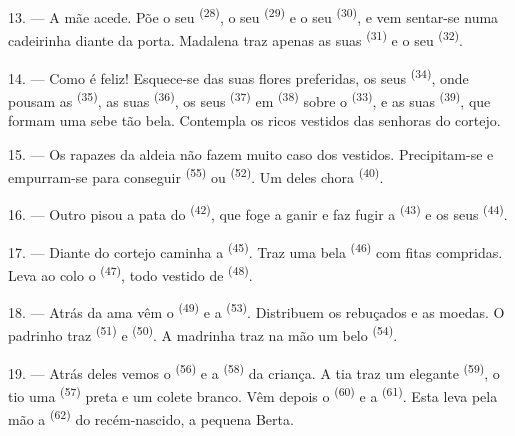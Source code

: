 13. --- A mãe acede. Põe o seu  \textsuperscript{(28)}, o
seu  \textsuperscript{(29)} e o seu 
\textsuperscript{(30)}, e vem sentar-se numa cadeirinha diante da porta.
Madalena traz apenas as suas  \textsuperscript{(31)} e o seu
 \textsuperscript{(32)}.

14. --- Como é feliz! Esquece-se das suas flores preferidas, os seus
 \textsuperscript{(34)}, onde pousam as 
\textsuperscript{(35)}, as suas  \textsuperscript{(36)}, os seus
 \textsuperscript{(37)} em 
\textsuperscript{(38)} sobre o  \textsuperscript{(33)}, e as suas
 \textsuperscript{(39)}, que formam uma sebe tão bela. Contempla
os ricos vestidos das senhoras do cortejo.

15. --- Os rapazes da aldeia não fazem muito caso dos vestidos.
Precipitam-se e empurram-se para conseguir 
\textsuperscript{(55)} ou  \textsuperscript{(52)}. Um deles chora
\textsuperscript{(40)}.

16. --- Outro pisou a pata do  \textsuperscript{(42)}, que foge a
ganir e faz fugir a  \textsuperscript{(43)} e os seus
 \textsuperscript{(44)}.

\VUsaut{5.0mm}
\VUsaut{4.0mm}

17. --- Diante do cortejo caminha a  \textsuperscript{(45)}. Traz uma
bela  \textsuperscript{(46)} com fitas compridas. Leva ao colo o
 \textsuperscript{(47)}, todo vestido de 
\textsuperscript{(48)}.

18. --- Atrás da ama vêm o  \textsuperscript{(49)} e a
 \textsuperscript{(53)}. Distribuem os rebuçados e as moedas. O
padrinho traz  \textsuperscript{(51)} e 
\textsuperscript{(50)}. A madrinha traz na mão um belo 
\textsuperscript{(54)}.

19. --- Atrás deles vemos o  \textsuperscript{(56)} e a 
\textsuperscript{(58)} da criança. A tia traz um elegante 
\textsuperscript{(59)}, o tio uma  \textsuperscript{(57)} preta e
um colete branco. Vêm depois o  \textsuperscript{(60)} e a
 \textsuperscript{(61)}. Esta leva pela mão a 
\textsuperscript{(62)} do recém-nascido, a pequena Berta.

